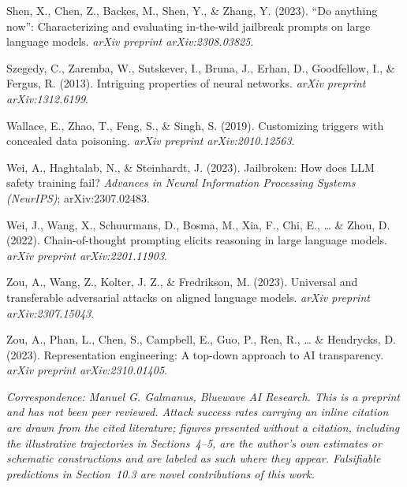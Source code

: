\documentclass[
  11pt,
]{article}
\begin{document}
Shen, X., Chen, Z., Backes, M., Shen, Y., \& Zhang, Y. (2023). ``Do
anything now'': Characterizing and evaluating in-the-wild jailbreak
prompts on large language models. \emph{arXiv preprint arXiv:2308.03825}.

Szegedy, C., Zaremba, W., Sutskever, I., Bruna, J., Erhan, D.,
Goodfellow, I., \& Fergus, R. (2013). Intriguing properties of neural
networks. \emph{arXiv preprint arXiv:1312.6199}.

Wallace, E., Zhao, T., Feng, S., \& Singh, S. (2019). Customizing
triggers with concealed data poisoning. \emph{arXiv preprint
arXiv:2010.12563}.

Wei, A., Haghtalab, N., \& Steinhardt, J. (2023). Jailbroken: How does
LLM safety training fail? \emph{Advances in Neural Information Processing
Systems (NeurIPS)}; arXiv:2307.02483.

Wei, J., Wang, X., Schuurmans, D., Bosma, M., Xia, F., Chi, E., \ldots{}
\& Zhou, D. (2022). Chain-of-thought prompting elicits reasoning in
large language models. \emph{arXiv preprint arXiv:2201.11903}.

Zou, A., Wang, Z., Kolter, J. Z., \& Fredrikson, M. (2023). Universal
and transferable adversarial attacks on aligned language models.
\emph{arXiv preprint arXiv:2307.15043}.

Zou, A., Phan, L., Chen, S., Campbell, E., Guo, P., Ren, R., \ldots{} \&
Hendrycks, D. (2023). Representation engineering: A top-down approach to
AI transparency. \emph{arXiv preprint arXiv:2310.01405}.

\emph{Correspondence: Manuel G. Galmanus, Bluewave AI Research. This is
a preprint and has not been peer reviewed. Attack success rates carrying
an inline citation are drawn from the cited literature; figures presented
without a citation, including the illustrative trajectories in
Sections~4--5, are the author's own estimates or schematic constructions
and are labeled as such where they appear. Falsifiable predictions in Section~10.3 are novel contributions of this work.}
\end{document}
